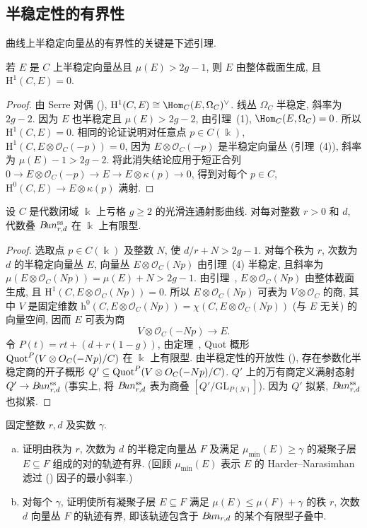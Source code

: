 \subsection{半稳定性的有界性}\label{src:9.2.3-subsection}
曲线上半稳定向量丛的有界性的关键是下述引理.
\begin{lemma}\label{src:9.2.7}
若 $E$ 是 $C$ 上半稳定向量丛且 $\mu(E)>2g-1$, 则 $E$ 由整体截面生成, 且 $\mathrm H^1(C,E)=0$.
\end{lemma}
\begin{proof}
由 Serre 对偶 (), $\mathrm H^1(C,E)\cong\Hom_C(E,\Omega_C)^\vee$. 线丛 $\Omega_C$ 半稳定, 斜率为 $2g-2$. 因为 $E$ 也半稳定且 $\mu(E)>2g-2$, 由引理~(1), $\Hom_C(E,\Omega_C)=0$. 所以 $\mathrm H^1(C,E)=0$. 相同的论证说明对任意点 $p\in C(\Bbbk)$, $\mathrm H^1(C,E\otimes\mathcal O_C(-p))=0$, 因为 $E\otimes\mathcal O_C(-p)$ 是半稳定向量丛 (引理~(4)), 斜率为 $\mu(E)-1>2g-2$. 将此消失结论应用于短正合列 $0\to E\otimes\mathcal O_C(-p)\to E\to E\otimes\kappa(p)\to0$, 得到对每个 $p\in C$, $\mathrm H^0(C,E)\to E\otimes\kappa(p)$ 满射.
\end{proof}
\begin{theorem}[半稳定性的有界性]\label{src:9.2.8}
设 $C$ 是代数闭域 $\Bbbk$ 上亏格 $g\geq2$ 的光滑连通射影曲线. 对每对整数 $r>0$ 和 $d$, 代数叠 $B\!un_{r,d}^{\mathrm{ss}}$ 在 $\Bbbk$ 上有限型.
\end{theorem}
\begin{proof}
选取点 $p\in C(\Bbbk)$ 及整数 $N$, 使 $d/r+N>2g-1$. 对每个秩为 $r$, 次数为 $d$ 的半稳定向量丛 $E$, 向量丛 $E\otimes\mathcal O_C(Np)$ 由引理~(4) 半稳定, 且斜率为 $\mu(E\otimes\mathcal O_C(Np))=\mu(E)+N>2g-1$. 由引理~, $E\otimes\mathcal O_C(Np)$ 由整体截面生成, 且 $\mathrm H^1(C,E\otimes\mathcal O_C(Np))=0$. 所以 $E\otimes\mathcal O_C(Np)$ 可表为 $V\otimes\mathcal O_C$ 的商, 其中 $V$ 是固定维数 $\mathrm h^0(C,E\otimes\mathcal O_C(Np))=\chi(C,E\otimes\mathcal O_C(Np))$ (与 $E$ 无关) 的向量空间, 因而 $E$ 可表为商
\[
V\otimes\mathcal O_C(-Np)\to E.
\]
令 $P(t)=rt+(d+r(1-g))$, 由定理~, Quot 概形 $\operatorname{Quot}^P(V\otimes O_C(-Np)/C)$ 在 $\Bbbk$ 上有限型. 由半稳定性的开放性 (), 存在参数化半稳定商的开子概形 $Q'\subseteq\operatorname{Quot}^P(V\otimes O_C(-Np)/C)$. $Q'$ 上的万有商定义满射态射 $Q'\to B\!un_{r,d}^{\mathrm{ss}}$ (事实上, 将 $B\!un_{r,d}^{\mathrm{ss}}$ 表为商叠 $[Q'/\mathrm{GL}_{P(N)}]$). 因为 $Q'$ 拟紧, $B\!un_{r,d}^{\mathrm{ss}}$ 也拟紧.
\end{proof}
\begin{exercise}[后文需要]\label{src:9.2.9}
固定整数 $r,d$ 及实数 $\gamma$.
\begin{enumerate}[(a)]
\item 证明由秩为 $r$, 次数为 $d$ 的半稳定向量丛 $F$ 及满足 $\mu_{\min}(E)\geq\gamma$ 的凝聚子层 $E\subseteq F$ 组成的对的轨迹有界. (回顾 $\mu_{\min}(E)$ 表示 $E$ 的 Harder--Narasimhan 滤过 () 因子的最小斜率.)
\item 对每个 $\gamma$, 证明使所有凝聚子层 $E\subseteq F$ 满足 $\mu(E)\leq\mu(F)+\gamma$ 的秩 $r$, 次数 $d$ 向量丛 $F$ 的轨迹有界, 即该轨迹包含于 $B\!un_{r,d}$ 的某个有限型子叠中.
\end{enumerate}
\end{exercise}
